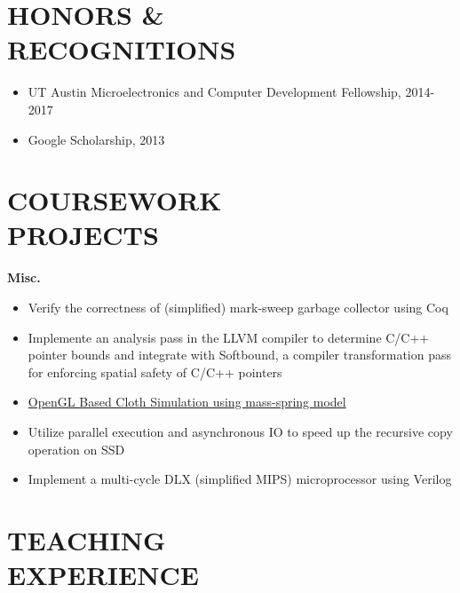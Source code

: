 \documentclass[margin, 9pt]{res} %
\begin{document}
\begin{resume}
\section{HONORS \&\\ RECOGNITIONS}

\vspace*{-1pt}
\begin{itemize}[leftmargin=*] \itemsep -1pt
	\item UT Austin Microelectronics and Computer Development Fellowship, 2014-2017
	\item Google Scholarship, 2013
\end{itemize}


\section{COURSEWORK\\ PROJECTS}

{\large\textbf{Misc.}}

\begin{itemize}[leftmargin=*] \itemsep -3pt
\vspace*{-5pt}
	\item Verify the correctness of (simplified) mark-sweep garbage collector using Coq
	\item Implemente an analysis pass in the LLVM compiler to determine C/C++ pointer bounds and integrate with Softbound, a compiler transformation pass for enforcing spatial safety of C/C++ pointers
	\item \href{http://www.cs.utexas.edu/~wc8348/cs384g/draw.html}{OpenGL Based Cloth Simulation using mass-spring model}
	\item Utilize parallel execution and asynchronous IO to speed up the recursive copy operation on SSD
	\item Implement a multi-cycle DLX (simplified MIPS) microprocessor using Verilog
\end{itemize}


\section{TEACHING\\ EXPERIENCE} 


\end{resume}
\end{document}
